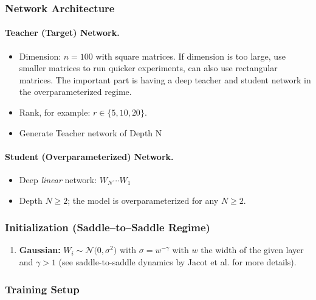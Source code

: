 \documentclass[11pt]{article}
\newcommand{\Wi}{\ensuremath{W_i}}
\newcommand{\Wprod}{\ensuremath{W_N\cdots W_1}}
\begin{document}
\subsubsection*{Network Architecture}

\paragraph*{Teacher (Target) Network.}
\begin{itemize}[nosep]
  \item Dimension: \(n = 100\) with square matrices. If dimension is too large, use smaller matrices to run quicker experiments, can also use rectangular matrices. The important part is having a deep teacher and student network in the overparameterized regime.
  \item Rank, for example: \(r \in \{5,10,20\}\).
  \item Generate Teacher network of Depth N
\end{itemize}

\paragraph*{Student (Overparameterized) Network.}
\begin{itemize}[nosep]
  \item Deep \emph{linear} network: \(\Wprod\)
  \item Depth \(N\ge2\); the model is overparameterized for any \(N\ge2\).
\end{itemize}

\subsubsection*{Initialization (Saddle–to–Saddle Regime)}
\label{sec:init}
\begin{enumerate}
  \item \textbf{Gaussian:} \(\Wi \sim \mathcal{N}\!\bigl(0,\sigma^2\bigr)\) with $\sigma=w^{-\gamma}$ with $w$ the width of the given layer and $\gamma>1$ (see saddle-to-saddle dynamics by Jacot et al. for more details).
\end{enumerate}

\subsubsection*{Training Setup}
\end{document}

